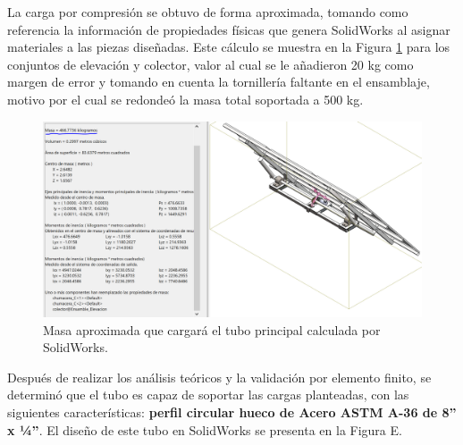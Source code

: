
La carga por compresión se obtuvo de forma aproximada, tomando como referencia la información de propiedades físicas que genera SolidWorks al asignar materiales a las piezas diseñadas. Este cálculo se muestra en la Figura \ref{fig:tal5} para los conjuntos de elevación y colector, valor al cual se le añadieron 20 kg como margen de error y tomando en cuenta la tornillería faltante en el ensamblaje, motivo por el cual se redondeó la masa total soportada a 500 kg.

\begin{figure}[H]
	\centering
	\includegraphics[width=13cm]{imagenes/tal5}
	\caption{Masa aproximada que cargará el tubo principal calculada por SolidWorks.}
	\label{fig:tal5}
\end{figure}

Después de realizar los análisis teóricos y la validación por elemento finito, se determinó que el tubo es capaz de soportar las cargas planteadas, con las siguientes características: \textbf{perfil circular hueco de Acero ASTM A-36 de 8” x ¼”}. El diseño de este tubo en SolidWorks se presenta en la Figura E.

